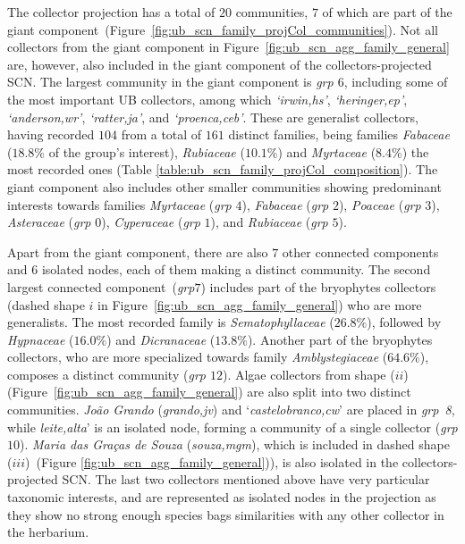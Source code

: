 The collector projection has a total of $20$ communities, $7$ of which are part of the giant component~(Figure~\ref{fig:ub_scn_family_projCol_communities}). 
Not all collectors from the giant component in Figure~\ref{fig:ub_scn_agg_family_general} are, however, also included in the giant component of the collectors-projected SCN.
The largest community in the giant component is \textit{grp $6$}, including some of the most important UB collectors, among which \textit{`irwin,hs'}, \textit{`heringer,ep'}, \textit{`anderson,wr'}, \textit{`ratter,ja'}, and \textit{`proenca,ceb'}.
These are generalist collectors, having recorded $104$ from a total of $161$ distinct families, being families \textit{Fabaceae} ($18.8\%$ of the group's interest), \textit{Rubiaceae} ($10.1\%$) and \textit{Myrtaceae} ($8.4\%$) the most recorded ones (Table \ref{table:ub_scn_family_projCol_composition}). 
%
The giant component also includes other smaller communities showing predominant interests towards families \textit{Myrtaceae} (\textit{grp} $4$), \textit{Fabaceae} (\textit{grp} $2$), \textit{Poaceae} (\textit{grp} $3$), \textit{Asteraceae} (\textit{grp} $0$), \textit{Cyperaceae} (\textit{grp} $1$), and \textit{Rubiaceae} (\textit{grp} $5$).

Apart from the giant component, there are also $7$ other connected components and $6$ isolated nodes, each of them making a distinct community.
The second largest connected component~(\textit{grp{$7$}}) includes part of the bryophytes collectors (dashed shape $i$ in Figure~\ref{fig:ub_scn_agg_family_general}) who are more generalists.
The most recorded family is \textit{Sematophyllaceae} ($26.8\%$), followed by \textit{Hypnaceae} ($16.0\%$) and \textit{Dicranaceae} ($13.8\%$). 
Another part of the bryophytes collectors, who are more specialized towards family \textit{Amblystegiaceae} ($64.6\%$), composes a distinct community (\textit{grp $12$}).
%
Algae collectors from shape ($ii$) (Figure~\ref{fig:ub_scn_agg_family_general}) are also split into two distinct communities.
\textit{João Grando} (\textit{grando,jv}) and `\textit{castelobranco,cw}' are placed in \textit{grp~8}, while \textit{leite,alta}' is an isolated node, forming a community of a single collector (\textit{grp $10$}).
\textit{Maria das Graças de Souza} (\textit{souza,mgm}), which is included in dashed shape ($iii$)~(Figure \ref{fig:ub_scn_agg_family_general})), is also isolated in the collectors-projected SCN.
The last two collectors mentioned above have very particular taxonomic interests, and are represented as isolated nodes in the projection as they show no strong enough species bags similarities with any other collector in the herbarium.

